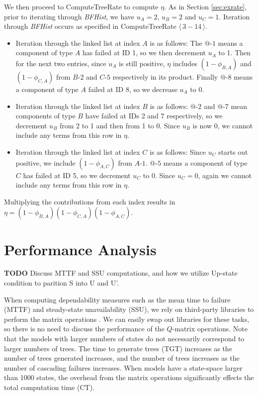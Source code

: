\documentclass[12pt]{article}
\newcommand{\varName}[1]{\textrm{\it#1}}
\newcommand{\citeBlock}[2]{$\langle \, #1 - #2 \, \rangle$}
\newcommand{\nodeLabel}[2]{\mbox{$#1$-$#2$}}
\begin{document}
We then proceed to ComputeTreeRate to compute $\eta$. As in Section
\ref{sec:exrate}, prior to iterating through \varName{BFHist}, we have $u_A =
2$, $u_B = 2$ and $u_C = 1$. Iteration through \varName{BFHist} occurs as
specified in ComputeTreeRate \citeBlock{3}{14}.

\begin{itemize}
\item Iteration through the linked list at index $A$ is as follows: The
\nodeLabel{@}{1} means a component of type $A$ has failed at ID 1, so we then
decrement $u_{A}$ to 1. Then for the next two entries, since $u_{A}$ is still
positive, $\eta$ includes $(1 - \phi_{B, A})$ and $(1 - \phi_{C, A})$ from
\nodeLabel{B}{2} and \nodeLabel{C}{5} respectively in its product. Finally
\nodeLabel{@}{8} means a component of type $A$ failed at ID 8, so we decrease
$u_A$ to 0.

\item Iteration through the linked list at index $B$ is as follows:
\nodeLabel{@}{2} and \nodeLabel{@}{7} mean components of type $B$ have failed at
IDs 2 and 7 respectively, so we decrement $u_{B}$ from 2 to 1 and then from 1 to
0. Since $u_{B}$ is now 0, we cannot include any terms from this row in $\eta$.

\item Iteration through the linked list at index $C$ is as follows: Since
$u_{C}$ starts out positive, we include $(1 - \phi_{A, C})$ from
\nodeLabel{A}{1}. \nodeLabel{@}{5} means a component of type $C$ has failed at
ID 5, so we decrement $u_{C}$ to 0. Since $u_{C} = 0$, again we cannot include
any terms from this row in $\eta$.
\end{itemize}
Multiplying the contributions from each index results in $\eta = (1 - \phi_{B,
A}) (1 - \phi_{C, A}) (1 - \phi_{A, C})$.
 
\section{Performance Analysis}
\textbf{TODO} Discuss MTTF and SSU computations, and how we utilize Up-state condition
to parition S into U and U'. 

When computing dependability measures such as the mean time to failure (MTTF)
and steady-state unavailability (SSU), we rely on third-party libraries to
perform the matrix operations \cite{OJAL:2013}. We can easily swap out
libraries for these tasks, so there is no need to discuss the performance of
the $Q$-matrix operations. Note that the models with larger numbers of states
do not necessarily correspond to larger numbers of trees. The time to generate
trees (TGT) increases as the number of trees generated increases, and the
number of trees increases as the number of cascading failures increases. When
models have a state-space larger than 1000 states, the overhead from the
matrix operations significantly effects the total computation time (CT).
\\
\end{document}
